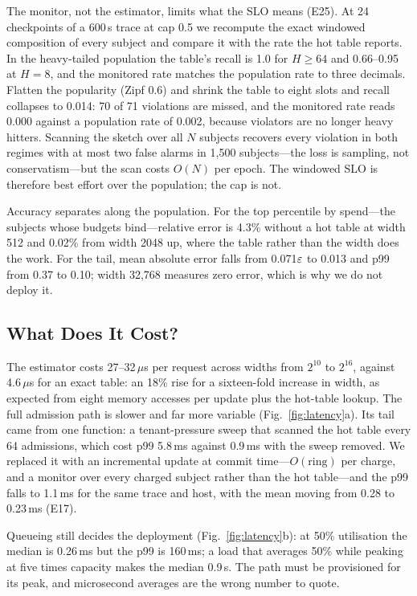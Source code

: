 The monitor, not the estimator, limits what the SLO means (E25). At 24 checkpoints of
a 600\,s trace at cap 0.5 we recompute the exact windowed composition of every subject
and compare it with the rate the hot table reports. In the heavy-tailed population the
table's recall is 1.0 for $H\ge64$ and 0.66--0.95 at $H{=}8$, and the monitored rate matches
the population rate to three decimals. Flatten the popularity
(Zipf 0.6) and shrink the table to eight slots and recall collapses to 0.014: 70 of 71
violations are missed, and the monitored rate reads 0.000 against a population rate of
0.002, because violators are no longer heavy hitters. Scanning the sketch over all $N$
subjects recovers every violation in both regimes with at most two false alarms in
1{,}500 subjects---the loss is sampling, not conservatism---but the scan costs $O(N)$
per epoch. The windowed SLO is therefore best effort over the population; the cap is
not.

Accuracy separates along the population. For the top percentile by spend---the
subjects whose budgets bind---relative error is 4.3\% without a hot table at width 512
and 0.02\% from width 2048 up, where the table rather than the width does the work. For
the tail, mean absolute error falls from 0.071$\varepsilon$ to 0.013 and p99 from 0.37 to 0.10;
width 32{,}768 measures zero error, which is why we do not deploy it.

\subsection{What Does It Cost?}
\label{sec:eval-cost}

The estimator costs 27--32\,$\mu$s per request across widths from $2^{10}$ to
$2^{16}$, against 4.6\,$\mu$s for an exact table: an 18\% rise for a sixteen-fold
increase in width, as expected from eight memory accesses per update plus the hot-table
lookup. The full admission path is slower and far more variable
(Fig.~\ref{fig:latency}a). Its tail came from one function: a tenant-pressure sweep
that scanned the hot table every 64 admissions, which cost p99 5.8\,ms against
0.9\,ms with the sweep removed. We replaced it with an incremental update at commit
time---$O(\text{ring})$ per charge, and a monitor over every charged subject rather
than the hot table---and the p99 falls to 1.1\,ms for the same trace and host, with
the mean moving from 0.28 to 0.23\,ms (E17).

Queueing still decides the deployment (Fig.~\ref{fig:latency}b): at 50\%
utilisation the median is 0.26\,ms but the p99 is 160\,ms; a load that averages
50\% while peaking at five times capacity makes the median 0.9\,s. The path must be
provisioned for its peak, and microsecond averages are the wrong number to quote.

